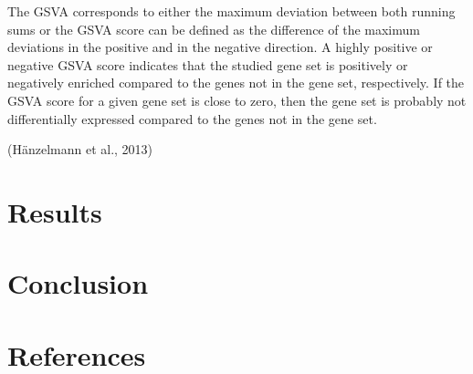 \documentclass[
  parskip,
  oneside]{scrreprt}
\begin{document}
The GSVA corresponds to either the maximum deviation between both
running sums or the GSVA score can be defined as the difference of the
maximum deviations in the positive and in the negative direction. A
highly positive or negative GSVA score indicates that the studied gene
set is positively or negatively enriched compared to the genes not in
the gene set, respectively. If the GSVA score for a given gene set is
close to zero, then the gene set is probably not differentially
expressed compared to the genes not in the gene set.

(Hänzelmann et al., 2013)

\hypertarget{results}{%
\chapter{Results}\label{results}}

\hypertarget{conclusion}{%
\chapter{Conclusion}\label{conclusion}}

\hypertarget{references}{%
\chapter*{References}\label{references}}
\end{document}
